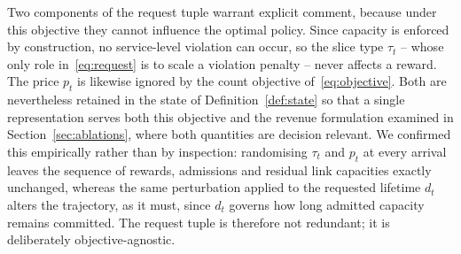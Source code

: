 \documentclass[10pt,journal,comsoc]{IEEEtran}
\begin{document}
Two components of the request tuple warrant explicit comment, because
under this objective they cannot influence the optimal policy. Since
capacity is enforced by construction, no service-level violation can
occur, so the slice type $\tau_t$ -- whose only role
in~\eqref{eq:request} is to scale a violation penalty -- never affects a
reward. The price $p_t$ is likewise ignored by the count objective
of~\eqref{eq:objective}. Both are nevertheless retained in the state of
Definition~\ref{def:state} so that a single representation serves both
this objective and the revenue formulation examined in
Section~\ref{sec:ablations}, where both quantities are decision relevant.
We confirmed this empirically rather than by inspection: randomising
$\tau_t$ and $p_t$ at every arrival leaves the sequence of rewards,
admissions and residual link capacities exactly unchanged, whereas the
same perturbation applied to the requested lifetime $d_t$ alters the
trajectory, as it must, since $d_t$ governs how long admitted capacity
remains committed. The request tuple is therefore not redundant; it is
deliberately objective-agnostic.
\end{document}
